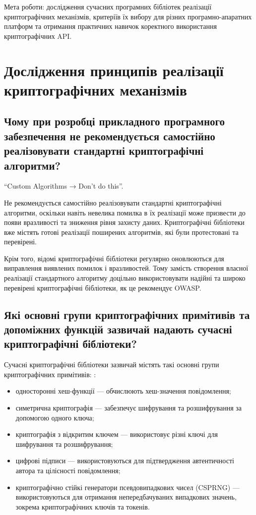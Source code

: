\noindent Мета роботи: дослідження сучасних програмних бібліотек реалізації криптографічних 
механізмів, критеріїв їх вибору для різних програмно-апаратних платформ та 
отримання практичних навичок коректного використання криптографічних API. 

\section{Дослідження принципів реалізації криптографічних механізмів}

\subsection{Чому при розробці прикладного програмного забезпечення не рекомендується самостійно реалізовувати стандартні криптографічні алгоритми?}

“Custom Algorithms → Don't do this”. \cite{Cheat Sheet}

Не рекомендується самостійно реалізовувати стандартні криптографічні алгоритми, оскільки навіть невелика помилка 
в їх реалізації може призвести до появи вразливості та зниження рівня захисту даних. Криптографічні бібліотеки вже містять 
готові реалізації поширених алгоритмів, які були протестовані та перевірені.

Крім того, відомі криптографічні бібліотеки регулярно оновлюються для виправлення виявлених помилок і вразливостей. 
Тому замість створення власної реалізації стандартного алгоритму доцільно використовувати надійні та широко перевірені 
криптографічні бібліотеки, як це рекомендує OWASP.

\subsection{Які основні групи криптографічних примітивів та допоміжних функцій зазвичай надають сучасні криптографічні бібліотеки?}

Сучасні криптографічні бібліотеки зазвичай містять такі основні групи криптографічних примітивів: \cite{Crypto Primitive Wiki}:

\begin{itemize}
\item односторонні хеш-функції --- обчислюють хеш-значення повідомлення;
\item симетрична криптографія --- забезпечує шифрування та розшифрування за допомогою одного ключа;
\item криптографія з відкритим ключем --- використовує різні ключі для шифрування та розшифрування;
\item цифрові підписи --- використовуються для підтвердження автентичності автора та цілісності повідомлення;
\item криптографічно стійкі генератори псевдовипадкових чисел (CSPRNG) --- використовуються для отримання непередбачуваних випадкових значень, 
зокрема криптографічних ключів та токенів.
\end{itemize}

